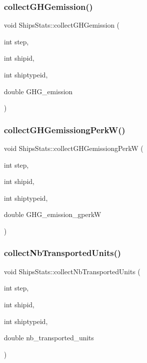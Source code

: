 \mbox{\label{class_ships_stats_ab520409c15fb63d21826aa445bd37c12}} 
\subsubsection{\texorpdfstring{collectGHGemission()}{collectGHGemission()}}
{\footnotesize\ttfamily void Ships\+Stats\+::collect\+G\+H\+Gemission (\begin{DoxyParamCaption}\item[{int}]{step,  }\item[{int}]{shipid,  }\item[{int}]{shiptypeid,  }\item[{double}]{G\+H\+G\+\_\+emission }\end{DoxyParamCaption})}

\mbox{\label{class_ships_stats_a4162cb85abbf4633e7db3975bd69920c}} 
\subsubsection{\texorpdfstring{collectGHGemissiongPerkW()}{collectGHGemissiongPerkW()}}
{\footnotesize\ttfamily void Ships\+Stats\+::collect\+G\+H\+Gemissiong\+PerkW (\begin{DoxyParamCaption}\item[{int}]{step,  }\item[{int}]{shipid,  }\item[{int}]{shiptypeid,  }\item[{double}]{G\+H\+G\+\_\+emission\+\_\+gperkW }\end{DoxyParamCaption})}

\mbox{\label{class_ships_stats_adf062575c6ae3be07e3ba73f9e09b74a}} 
\subsubsection{\texorpdfstring{collectNbTransportedUnits()}{collectNbTransportedUnits()}}
{\footnotesize\ttfamily void Ships\+Stats\+::collect\+Nb\+Transported\+Units (\begin{DoxyParamCaption}\item[{int}]{step,  }\item[{int}]{shipid,  }\item[{int}]{shiptypeid,  }\item[{double}]{nb\+\_\+transported\+\_\+units }\end{DoxyParamCaption})}

